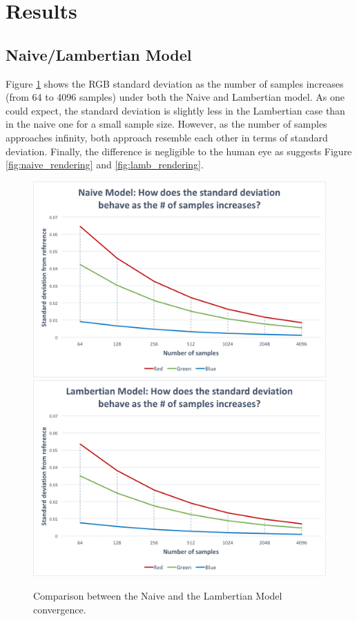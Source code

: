 \documentclass{article}
\begin{document}
\section*{Results}

\subsection*{Naive/Lambertian Model}
Figure \ref{fig:lamb} shows the RGB standard deviation as the number of samples increases (from 64 to 4096 samples) under both the Naive and Lambertian model. As one could expect, the standard deviation is slightly less in the Lambertian case than in the naive one for a small sample size. However, as the number of samples approaches infinity, both approach resemble each other in terms of standard deviation. Finally, the difference  is negligible to the human eye as suggests Figure \ref{fig:naive_rendering} and \ref{fig:lamb_rendering}.

\begin{figure}[p]
\centering
\includegraphics[width=\textwidth]{assets/naive_stdev}
\\
\includegraphics[width=\textwidth]{assets/lamb_stdev}

\caption{Comparison between the Naive and the Lambertian Model convergence.}
\label{fig:lamb}
\end{figure}
\end{document}
